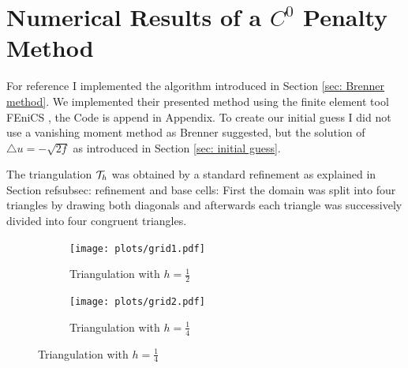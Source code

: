 
\section{Numerical Results of a $C^0$ Penalty Method}\label{sec: numerical results brenner}



For reference I implemented the algorithm introduced in Section \ref{sec: Brenner method}.
We implemented their presented method using the finite element tool FEniCS \cite{FEniCS}, the Code is append in Appendix. 
To create our initial guess I did not use a vanishing moment method as Brenner suggested, but the solution of $\triangle u = -\sqrt{2f}$ as introduced in Section \ref{sec: initial guess}. 

The triangulation $\mathcal{T}_h$ was obtained by a standard refinement as explained in Section ref{subsec: refinement and base cells}: First the domain was split into four triangles by drawing both diagonals and afterwards each triangle was successively divided into four congruent triangles.
\begin{figure}[H]
	\centering
	\begin{subfigure}{0.45\textwidth}
		\texttt{[image: plots/grid1.pdf]}
		\caption{Triangulation with $h=\frac 1 2$}
		\label{fig: grid1}
	\end{subfigure}
	\begin{subfigure}{0.45\textwidth}
		\texttt{[image: plots/grid2.pdf]}
		\caption{Triangulation with $h=\frac 1 4$}
		\label{fig: grid}
	\end{subfigure}	
	\caption{Triangulation with $h=\frac 1 4$}
	\label{fig: grids}
\end{figure}

